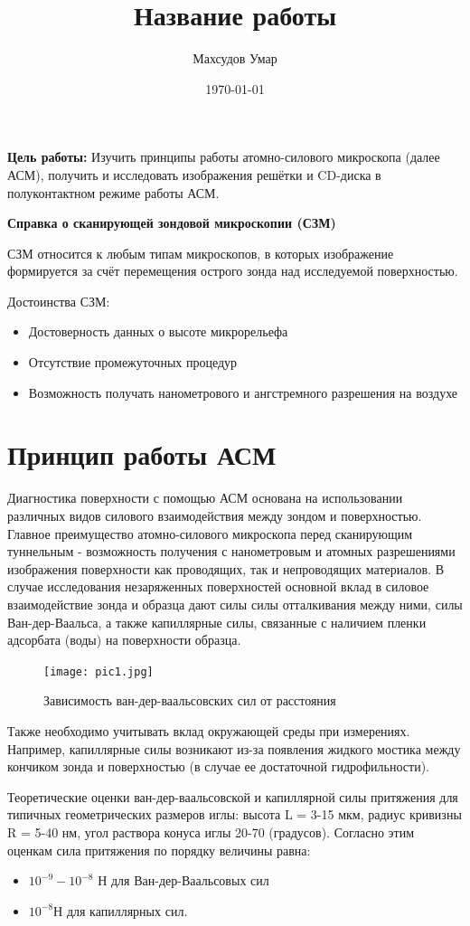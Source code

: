 \documentclass[a4paper,12pt]{article}
\author{Махсудов Умар}
\title{Название работы}
\date{\today}
\theoremstyle{plain} %
\theoremstyle{definition} %
\theoremstyle{remark} %
\begin{document}
\textbf{Цель работы:} Изучить принципы работы атомно-силового микроскопа (далее АСМ), получить и исследовать изображения решётки и CD-диска в полуконтактном режиме работы АСМ.

\textbf{Справка о сканирующей зондовой микроскопии (СЗМ)}


СЗМ относится к любым типам микроскопов, в которых изображение формируется за счёт перемещения острого зонда над исследуемой поверхностью.


Достоинства СЗМ:
\begin{itemize}
	\item
	Достоверность данных о высоте микрорельефа
	\item
	Отсутствие промежуточных процедур
	\item
	Возможность получать нанометрового и ангстремного разрешения на воздухе
\end{itemize}
\section{Принцип работы АСМ}
Диагностика поверхности с помощью АСМ основана на использовании различных видов силового взаимодействия между зондом и поверхностью. Главное преимущество атомно-силового микроскопа перед сканирующим туннельным - возможность получения с нанометровым и атомных разрешениями изображения поверхности как проводящих, так и непроводящих материалов. В случае исследования незаряженных поверхностей основной вклад в силовое взаимодействие зонда и образца дают силы силы отталкивания между ними, силы Ван-дер-Ваальса, а также капиллярные силы, связанные с наличием пленки адсорбата (воды) на поверхности образца.
\begin{figure}[H]
	\centering
	\texttt{[image: pic1.jpg]}
	\caption{Зависимость ван-дер-ваальсовских сил от расстояния}
	\label{pic1}
\end{figure}

Также необходимо учитывать вклад окружающей среды при измерениях. Например, капиллярные силы возникают из-за появления жидкого мостика между кончиком зонда и поверхностью (в случае ее достаточной гидрофильности).


Теоретические оценки ван-дер-ваальсовской и капиллярной силы притяжения для типичных геометрических размеров иглы: высота L = 3-15 мкм, радиус кривизны R = 5-40 нм, угол раствора конуса иглы 20-70 (градусов). Согласно этим оценкам сила притяжения по порядку величины равна:
\begin{itemize}
	\item
	$ 10^{-9}-10^{-8} $ Н для Ван-дер-Ваальсовых сил
	\item
	$ 10^{-8} Н $ для капиллярных сил. 
	
\end{itemize}
\end{document}
